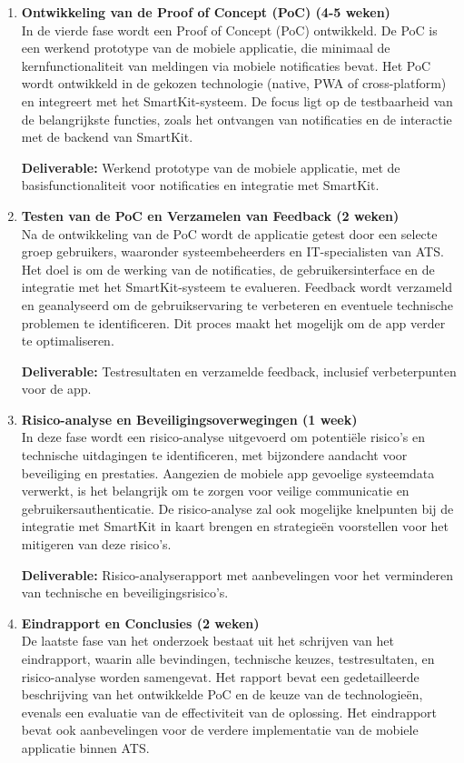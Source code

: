 \begin{enumerate}[label=\textbf{Fase \arabic*:}, left=0pt, labelsep=1em, itemsep=1em, topsep=1em]
	\item \textbf{Ontwikkeling van de Proof of Concept (PoC) (4-5 weken)} \\
	In de vierde fase wordt een Proof of Concept (PoC) ontwikkeld. De PoC is een werkend prototype van de mobiele applicatie, die minimaal de kernfunctionaliteit van meldingen via mobiele notificaties bevat. Het PoC wordt ontwikkeld in de gekozen technologie (native, PWA of cross-platform) en integreert met het SmartKit-systeem. De focus ligt op de testbaarheid van de belangrijkste functies, zoals het ontvangen van notificaties en de interactie met de backend van SmartKit.
	
	\textbf{Deliverable:} Werkend prototype van de mobiele applicatie, met de basisfunctionaliteit voor notificaties en integratie met SmartKit.
	
	\item \textbf{Testen van de PoC en Verzamelen van Feedback (2 weken)} \\
	Na de ontwikkeling van de PoC wordt de applicatie getest door een selecte groep gebruikers, waaronder systeembeheerders en IT-specialisten van ATS. Het doel is om de werking van de notificaties, de gebruikersinterface en de integratie met het SmartKit-systeem te evalueren. Feedback wordt verzameld en geanalyseerd om de gebruikservaring te verbeteren en eventuele technische problemen te identificeren. Dit proces maakt het mogelijk om de app verder te optimaliseren.
	
	\textbf{Deliverable:} Testresultaten en verzamelde feedback, inclusief verbeterpunten voor de app.
	
	\item \textbf{Risico-analyse en Beveiligingsoverwegingen (1 week)} \\
	In deze fase wordt een risico-analyse uitgevoerd om potentiële risico’s en technische uitdagingen te identificeren, met bijzondere aandacht voor beveiliging en prestaties. Aangezien de mobiele app gevoelige systeemdata verwerkt, is het belangrijk om te zorgen voor veilige communicatie en gebruikersauthenticatie. De risico-analyse zal ook mogelijke knelpunten bij de integratie met SmartKit in kaart brengen en strategieën voorstellen voor het mitigeren van deze risico’s.
	
	\textbf{Deliverable:} Risico-analyserapport met aanbevelingen voor het verminderen van technische en beveiligingsrisico’s.
	
	\item \textbf{Eindrapport en Conclusies (2 weken)} \\
	De laatste fase van het onderzoek bestaat uit het schrijven van het eindrapport, waarin alle bevindingen, technische keuzes, testresultaten, en risico-analyse worden samengevat. Het rapport bevat een gedetailleerde beschrijving van het ontwikkelde PoC en de keuze van de technologieën, evenals een evaluatie van de effectiviteit van de oplossing. Het eindrapport bevat ook aanbevelingen voor de verdere implementatie van de mobiele applicatie binnen ATS.
	

\end{enumerate}
